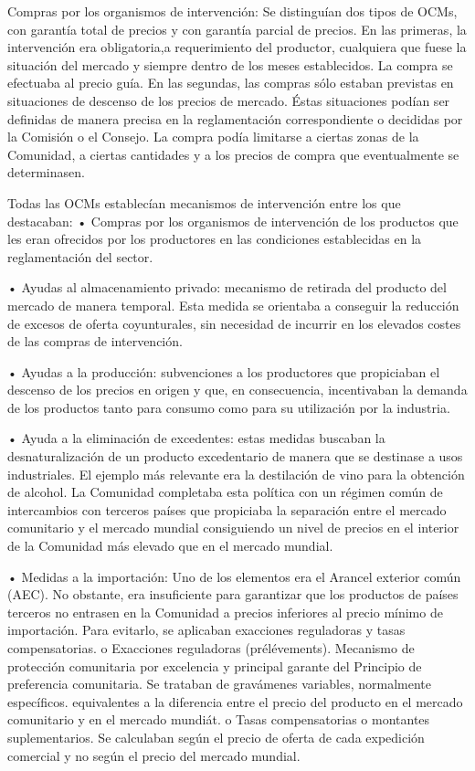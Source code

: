 \documentclass[10pt,a4paper]{article}
\begin{document}
Compras por los organismos de intervención: Se distinguían dos tipos de OCMs, con garantía total de precios y con garantía parcial de precios. En las primeras, la intervención era obligatoria,a requerimiento del productor, cualquiera que fuese la situación del mercado y siempre dentro de los meses establecidos. La compra se efectuaba al precio guía. En las segundas, las compras sólo estaban previstas en situaciones de descenso de los precios de mercado. Éstas situaciones podían ser definidas de manera precisa en la reglamentación correspondiente o decididas por la Comisión o el Consejo. La compra podía limitarse a ciertas zonas de la Comunidad, a ciertas cantidades y a los precios de compra que eventualmente se determinasen.

Todas las OCMs establecían mecanismos de intervención entre los que destacaban:
• Compras por los organismos de intervención de los productos que les eran ofrecidos por los productores en las condiciones establecidas en la reglamentación del sector. 

• Ayudas al almacenamiento privado: mecanismo de retirada del producto del mercado de manera temporal. Esta medida se orientaba a conseguir la reducción de excesos de oferta coyunturales, sin necesidad de incurrir en los elevados costes de las compras de intervención.

• Ayudas a la producción: subvenciones a los productores que propiciaban el descenso de los precios en origen y que, en consecuencia, incentivaban la demanda de los productos tanto para consumo como para su utilización por la industria.

• Ayuda a la eliminación de excedentes: estas medidas buscaban la desnaturalización de un producto excedentario de manera que se destinase a usos industriales. El ejemplo más relevante era la destilación de vino para la obtención de alcohol. La Comunidad completaba esta política con un régimen común de intercambios con terceros países que propiciaba la separación entre el mercado comunitario y el mercado mundial consiguiendo un nivel de precios en el interior de la Comunidad más elevado que en el mercado mundial.

• Medidas a la importación: Uno de los elementos era el Arancel exterior común (AEC). No obstante, era insuficiente para garantizar que los productos de países terceros no entrasen en la Comunidad a precios inferiores al precio mínimo de importación. Para evitarlo, se aplicaban exacciones reguladoras y tasas compensatorias. o Exacciones reguladoras (prélévements). Mecanismo de protección comunitaria por excelencia y principal garante del Principio de preferencia comunitaria. Se trataban de gravámenes variables, normalmente específicos. equivalentes a la diferencia entre el precio del producto en el mercado comunitario y en el mercado mundiát. o Tasas compensatorias o montantes suplementarios. Se calculaban según el precio de oferta de cada expedición comercial y no según el precio del mercado mundial.
\end{document}

